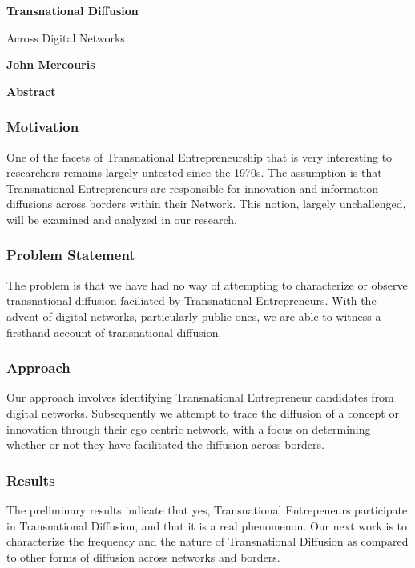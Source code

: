 \thispagestyle{plain}
\begin{center}
    \Large
    \textbf{Transnational Diffusion}
    
    \vspace{0.4cm}
    \large
    Across Digital Networks
    
    \vspace{0.4cm}
    \textbf{John Mercouris}
    
    \vspace{0.9cm}
    \textbf{Abstract}
\end{center}

\subsubsection{Motivation}
One of the facets of Transnational Entrepreneurship that is very interesting to researchers remains largely untested since the 1970s. The assumption is that Transnational Entrepreneurs are responsible for innovation and information diffusions across borders within their Network. This notion, largely unchallenged, will be examined and analyzed in our research.

\subsubsection{Problem Statement}
The problem is that we have had no way of attempting to characterize or observe transnational diffusion faciliated by Transnational Entrepreneurs. With the advent of digital networks, particularly public ones, we are able to witness a firsthand account of transnational diffusion.

\subsubsection{Approach}
Our approach involves identifying Transnational Entrepreneur candidates from digital networks. Subsequently we attempt to trace the diffusion of a concept or innovation through their ego centric network, with a focus on determining whether or not they have facilitated the diffusion across borders.

\subsubsection{Results}
The preliminary results indicate that yes, Transnational Entrepeneurs participate in Transnational Diffusion, and that it is a real phenomenon. Our next work is to characterize the frequency and the nature of Transnational Diffusion as compared to other forms of diffusion across networks and borders.

